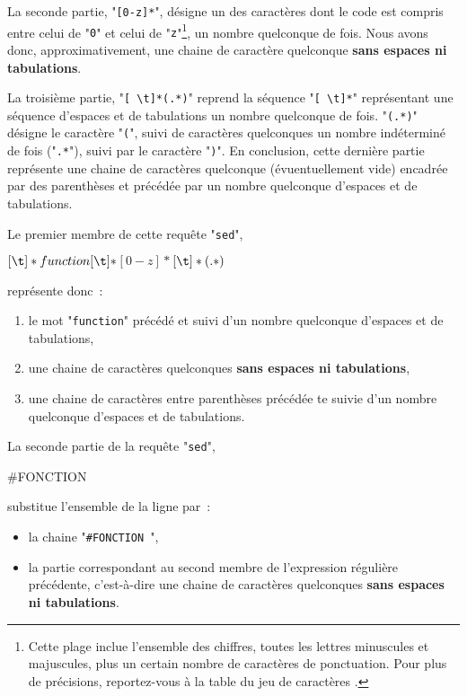 \begin{example}
La seconde partie, "\verb=[0-z]*=", d{\'e}signe un des caract{\`e}res
dont le code {\ASCII} est compris entre celui de "{\tt 0}" et celui
de "{\tt z}"\footnote{Cette plage inclue l'ensemble des chiffres,
toutes les lettres minuscules et majuscules, plus un certain nombre de
caract{\`e}res de ponctuation. Pour plus de pr{\'e}cisions, reportez-vous
{\`a} la table du jeu de caract{\`e}res {\ASCII}.}, un nombre quelconque de fois.
Nous avons donc, approximativement, une chaine de caract{\`e}re quelconque
{\bf sans espaces ni tabulations}.

La troisi{\`e}me partie, "\verb*=[ \t]*(.*)=" reprend la s{\'e}quence
"\verb*=[ \t]*=" repr{\'e}sentant une s{\'e}quence d'espaces et de tabulations
un nombre quelconque de fois. "\verb*=(.*)=" d{\'e}signe le caract{\`e}re
"{\tt (}", suivi de caract{\`e}res quelconques un nombre ind{\'e}termin{\'e} de fois
("\verb=.*="), suivi par le caract{\`e}re "{\tt )}". En conclusion,
cette derni{\`e}re partie repr{\'e}sente une chaine de caract{\`e}res quelconque
({\'e}vuentuellement vide) encadr{\'e}e par des parenth{\`e}ses et pr{\'e}c{\'e}d{\'e}e par un
nombre quelconque d'espaces et de tabulations.

Le premier membre de cette requ{\^e}te "{\tt sed}",
\begin{center}
\begin{verbatim*}
\([ \t]*function[ \t]*\)\([0-z]*\)\([ \t]*(.*)\)
\end{verbatim*}
\end{center}
repr{\'e}sente donc~:
\begin{enumerate}
	\item	le mot "{\tt function}" pr{\'e}c{\'e}d{\'e} et suivi d'un nombre
			quelconque d'espaces et de tabulations,
	\item	une chaine de caract{\`e}res quelconques {\bf sans espaces ni
			tabulations},
	\item	une chaine de caract{\`e}res entre parenth{\`e}ses pr{\'e}c{\'e}d{\'e}e te suivie
			d'un nombre quelconque d'espaces et de tabulations.
\end{enumerate}

La seconde partie de la requ{\^e}te "{\tt sed}",
\begin{center}
\begin{verbatim*}
#FONCTION \2
\end{verbatim*}
\end{center}
substitue l'ensemble de la ligne par~:
\begin{itemize}
	\item	la chaine "\verb*=#FONCTION =",
	\item	la partie correspondant au second membre de l'expression
			r{\'e}guli{\`e}re pr{\'e}c{\'e}dente, c'est-{\`a}-dire une chaine de caract{\`e}res
			quelconques {\bf sans espaces ni tabulations}.
\end{itemize}
\end{example}

